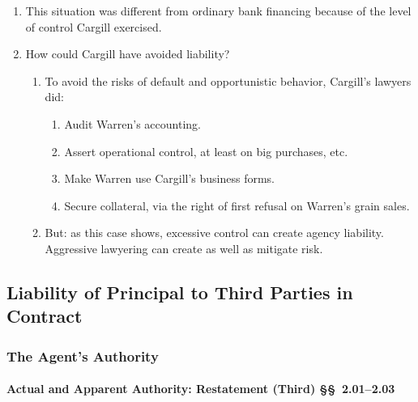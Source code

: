 \begin{enumerate}
    relationship to that of a principal and agent.\footnote{Casebook p.  
    11--12.}
    \item This situation was different from ordinary bank financing because of 
    the level of control Cargill exercised.
    \item How could Cargill have avoided liability?
    \begin{enumerate}
        \item To avoid the risks of default and opportunistic behavior, 
        Cargill's lawyers did:
        \begin{enumerate}
            \item Audit Warren's accounting.
            \item Assert operational control, at least on big purchases, etc.
            \item Make Warren use Cargill's business forms.
            \item Secure collateral, via the right of first refusal on 
            Warren's grain sales.
        \end{enumerate}
        \item But: as this case shows, excessive control can create agency 
        liability. Aggressive lawyering can create as well as mitigate risk.
    \end{enumerate}
\end{enumerate}

\subsection{Liability of Principal to Third Parties in Contract}

\subsubsection{The Agent's Authority}

\paragraph{Actual and Apparent Authority: Restatement (Third) \S\S\ 
2.01--2.03}

